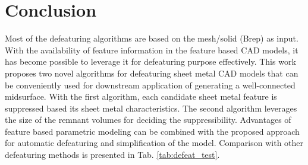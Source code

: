 
\section{Conclusion}

Most of the defeaturing algorithms are based on the mesh/solid (Brep) as input. With the availability of feature information in the feature based CAD models, it has become possible to leverage it for defeaturing purpose effectively. This work proposes two novel algorithms for defeaturing sheet metal CAD models that can be conveniently used for downstream application of generating a well-connected midsurface. With the first algorithm, each candidate sheet metal feature is suppressed based its sheet metal characteristics. The second algorithm leverages the size of the remnant volumes for deciding the suppressibility. Advantages of feature based parametric modeling can be combined with the proposed approach for automatic defeaturing and simplification of the model. Comparison with other defeaturing methods is presented in Tab. \ref{tab:defeat_test}.
\begin{table}[h!]
  \centering
 \caption{Comparison with Other Simplification Methods}
  \label{tab:defeat_test}
\end{table}


